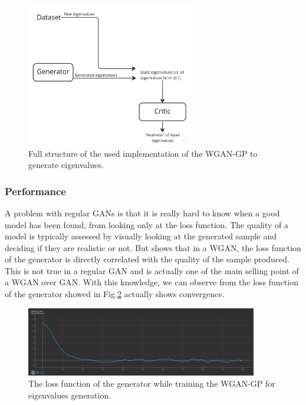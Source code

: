 \documentclass{article}
\begin{document}
\begin{figure}
    \centering
    \includegraphics[width=0.65\textwidth]{../figs/evals_wgangp_full_structure.jpg}
    \caption{Full structure of the used implementation of the WGAN-GP to generate eigenvalues.}
    \label{fig:evals_wgangp_full_structure}
\end{figure}

\subsubsection{Performance}

A problem with regular GANs is that it is really hard to know when a good model has been found, from looking only at the loss function. The quality of a model is typically assessed by visually looking at the generated sample and deciding if they are realistic or not. But \cite{arjovsky2017wasserstein} shows that in a WGAN, the loss function of the generator is directly correlated with the quality of the sample produced. This is not true in a regular GAN and is actually one of the main selling point of a WGAN over GAN. With this knowledge, we can observe from the loss function of the generator showed in Fig.\ref{fig:evals_g_loss} actually shows convergence. 

\begin{figure}
    \centering
    \includegraphics[width=0.9\textwidth]{../figs/evals_g_loss.png}    
    \caption{The loss function of the generator while training the WGAN-GP for eigenvalues generation.}
    \label{fig:evals_g_loss}
\end{figure} 
\end{document}
